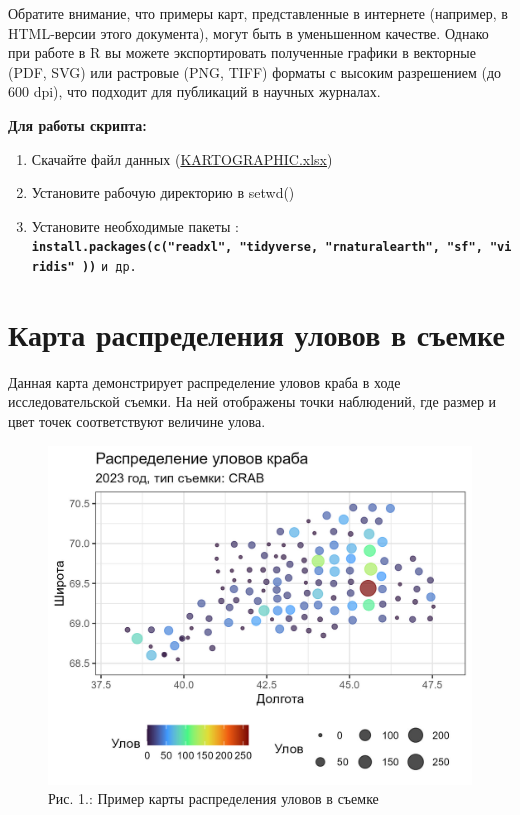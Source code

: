 \documentclass[
  letterpaper,
  DIV=11,
  numbers=noendperiod]{scrreprt}
\begin{document}
Обратите внимание, что примеры карт, представленные в интернете
(например, в HTML-версии этого документа), могут быть в уменьшенном
качестве. Однако при работе в R вы можете экспортировать полученные
графики в векторные (PDF, SVG) или растровые (PNG, TIFF) форматы с
высоким разрешением (до 600 dpi), что подходит для публикаций в научных
журналах.

\textbf{Для работы скрипта:}

\begin{enumerate}
\def\labelenumi{\arabic{enumi}.}
\item
  Скачайте файл данных
  (\href{https://mombus.github.io/cRab/data/KARTOGRAPHIC.xlsx}{KARTOGRAPHIC.xlsx})
\item
  Установите рабочую директорию в setwd()
\item
  Установите необходимые пакеты :
  \textbf{\texttt{install.packages(c("readxl",\ "tidyverse,\ "rnaturalearth",\ "sf",\ "viridis"\ ))}}
  \texttt{и\ др.}
\end{enumerate}

\section{Карта распределения уловов в
съемке}\label{ux43aux430ux440ux442ux430-ux440ux430ux441ux43fux440ux435ux434ux435ux43bux435ux43dux438ux44f-ux443ux43bux43eux432ux43eux432-ux432-ux441ux44aux435ux43cux43aux435}

Данная карта демонстрирует распределение уловов краба в ходе
исследовательской съемки. На ней отображены точки наблюдений, где размер
и цвет точек соответствуют величине улова.

\begin{figure}[H]

{\centering \includegraphics[width=0.7\linewidth,height=\textheight,keepaspectratio]{images/KARTOGRAPH1.jpg}

}

\caption{Рис. 1.: Пример карты распределения уловов в съемке}

\end{figure}%
\end{document}
